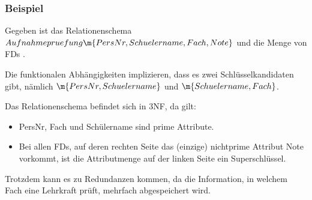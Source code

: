 \documentclass{lehramt-informatik-haupt}
\begin{document}




\subsubsection{Beispiel}

Gegeben ist das Relationenschema
$Aufnahmepruefung\m{PersNr, Schuelername, Fach, Note}$
und die Menge von FDs
.

Die funktionalen Abhängigkeiten implizieren, dass es zwei
Schlüsselkandidaten gibt, nämlich
$\m{PersNr, Schuelername}$ und
$\m{Schuelername, Fach}$.

Das Relationenschema befindet sich in 3NF, da gilt:

\begin{itemize}
\item PersNr, Fach und Schülername sind prime Attribute.

\item Bei allen FDs, auf deren rechten Seite das (einzige) nichtprime
Attribut Note vorkommt, ist die Attributmenge auf der linken Seite ein
Superschlüssel.
\end{itemize}

Trotzdem kann es zu Redundanzen kommen, da die Information, in welchem
Fach eine Lehrkraft prüft, mehrfach abgespeichert wird.

\literatur
\end{document}
